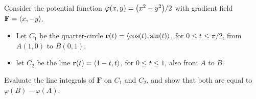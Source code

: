 \documentclass[../mathNotesPreamble]{subfiles}
\begin{document}
  \begin{ex*}
    Consider the potential function $\varphi(x,y)={\left(x^2-y^2\right)}/2$ with gradient field $\mathbf F={\left\langle x,-y \right\rangle}$.
    \begin{itemize}
      \item Let $C_1$ be the quarter-circle ${\mathbf{r}}(t)={\left\langle \cos(t),\sin(t) \right\rangle}$, for $0\leq t\leq \pi/2$, from $A(1,0)$ to $B(0,1)$,
      \item let $C_2$ be the line ${\mathbf{r}}(t)={\left\langle 1-t,t \right\rangle}$, for $0\leq t\leq 1$, also from $A$ to $B$.
    \end{itemize}
    Evaluate the line integrals of $\mathbf F$ on $C_1$ and $C_2$, and show that both are equal to $\varphi(B)-\varphi(A)$.
  \end{ex*}
  \pagebreak
\end{document}
